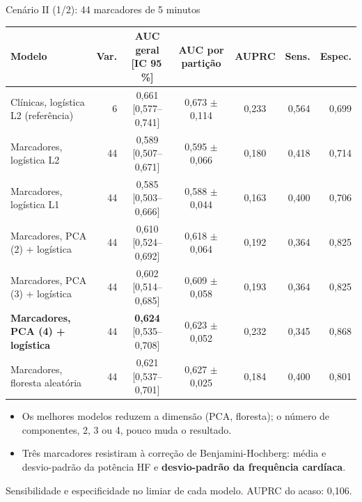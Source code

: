\documentclass[10pt,aspectratio=169]{beamer}
\newcommand{\fonte}[1]{\par\vfill{\scriptsize\color{cinza}#1}}
\begin{document}
\begin{frame}{Cenário II (1/2): 44 marcadores de 5 minutos}
  \centering
  \scriptsize
  \setlength{\tabcolsep}{3.5pt}
  \begin{tabular}{lrcccrr}
    \toprule
    Modelo & Var. & AUC geral [IC 95\,\%] & AUC por partição & AUPRC & Sens. & Espec. \\
    \midrule
    Clínicas, logística L2 (referência) & 6 & 0,661 [0,577--0,741] & 0,673 $\pm$ 0,114 & 0,233 & 0,564 & 0,699 \\
    \midrule
    Marcadores, logística L2 & 44 & 0,589 [0,507--0,671] & 0,595 $\pm$ 0,066 & 0,180 & 0,418 & 0,714 \\
    Marcadores, logística L1 & 44 & 0,585 [0,503--0,666] & 0,588 $\pm$ 0,044 & 0,163 & 0,400 & 0,706 \\
    Marcadores, PCA (2) + logística & 44 & 0,610 [0,524--0,692] & 0,618 $\pm$ 0,064 & 0,192 & 0,364 & 0,825 \\
    Marcadores, PCA (3) + logística & 44 & 0,602 [0,514--0,685] & 0,609 $\pm$ 0,058 & 0,193 & 0,364 & 0,825 \\
    \textbf{Marcadores, PCA (4) + logística} & 44 & \textbf{0,624} [0,535--0,708] & 0,623 $\pm$ 0,052 & 0,232 & 0,345 & 0,868 \\
    Marcadores, floresta aleatória & 44 & 0,621 [0,537--0,701] & 0,627 $\pm$ 0,025 & 0,184 & 0,400 & 0,801 \\
    \bottomrule
  \end{tabular}
  \vspace{0.2cm}
  \begin{itemize}
    \footnotesize
    \item Os melhores modelos reduzem a dimensão (PCA, floresta); o número de
      componentes, 2, 3 ou 4, pouco muda o resultado.
    \item Três marcadores resistiram à correção de Benjamini-Hochberg: média e
      desvio-padrão da potência HF e \textbf{desvio-padrão da frequência
      cardíaca}.
  \end{itemize}
  \fonte{Sensibilidade e especificidade no limiar de cada modelo. AUPRC do acaso: 0,106.}
\end{frame}
\end{document}
